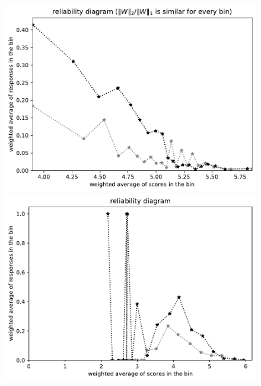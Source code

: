 \documentclass{article}
\newlength{\vertsep}
\newlength{\imsize}
\begin{document}
\begin{figure}
\begin{centering}
\parbox{\imsize}{\includegraphics[width=\imsize]
{../codes/weighted/County_of_San_Francisco_vs_Contra_Costa-LNGI/equierrs20.pdf}}
\quad\quad
\parbox{\imsize}{\includegraphics[width=\imsize]
{../codes/weighted/County_of_San_Francisco_vs_Contra_Costa-LNGI/equiscores20.pdf}}

\vspace{\vertsep}


\end{centering}
\end{figure}
\end{document}
